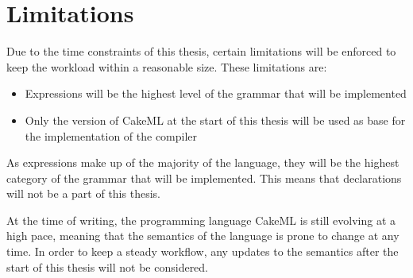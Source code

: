 \section{Limitations}
Due to the time constraints of this thesis, certain limitations will be enforced
to keep the workload within a reasonable size. These limitations are:

\begin{itemize}
\item Expressions will be the highest level of the grammar that will be implemented
\item Only the version of CakeML at the start of this thesis will be used as base for the implementation of the compiler
\end{itemize}

As expressions make up of the majority of the language, they will be the highest
category of the grammar that will be implemented. This means that declarations
will not be a part of this thesis.

At the time of writing, the programming language CakeML is still evolving at a
high pace, meaning that the semantics of the language is prone to change at
any time. In order to keep a steady workflow, any updates to the semantics after
the start of this thesis will not be considered.
